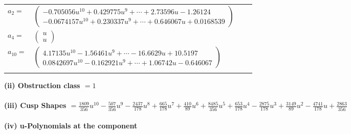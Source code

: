 \documentclass[1p]{elsarticle_modified}
\theoremstyle{definition}
\begin{document}
\begin{tabular}{m{7pt} m{180pt} m{7pt} m{180pt} }
\flushright $a_{2}=$&$\begin{pmatrix}-0.705056 u^{10}+0.429775 u^{9}+\cdots+2.73596 u-1.26124\\-0.0674157 u^{10}+0.230337 u^{9}+\cdots+0.646067 u+0.0168539\end{pmatrix}$ \\
\flushright $a_{4}=$&$\begin{pmatrix}u\\u\end{pmatrix}$ \\
\flushright $a_{10}=$&$\begin{pmatrix}4.17135 u^{10}-1.56461 u^{9}+\cdots-16.6629 u+10.5197\\0.0842697 u^{10}-0.162921 u^{9}+\cdots+1.06742 u-0.646067\end{pmatrix}$\\&\end{tabular}
\flushleft \textbf{(ii) Obstruction class $= 1$}\\~\\
\flushleft \textbf{(iii) Cusp Shapes $= \frac{1809}{356} u^{10}-\frac{507}{356} u^9-\frac{2437}{178} u^8+\frac{665}{178} u^7+\frac{410}{89} u^6+\frac{8485}{356} u^5+\frac{653}{178} u^4-\frac{2875}{178} u^3+\frac{3149}{89} u^2-\frac{4741}{178} u+\frac{2863}{356}$}\\~\\
\newpage\renewcommand{\arraystretch}{1}
\flushleft \textbf{(iv) u-Polynomials at the component}\newline \\
\end{document}

